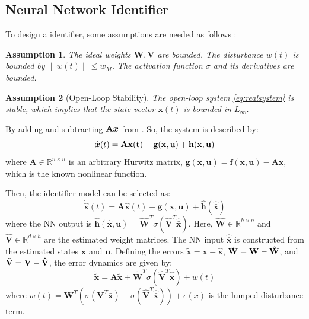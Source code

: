\documentclass[10pt,twocolumn]{ICCAS}
\newcommand{\R}{\mathbb{R}}
\newcommand{\xtilde}{\tilde{\bm{x}}}
\newcommand{\xhat}{\hat{\bm{x}}}
\newcommand{\xbar}{\bar{\bm{x}}}
\newcommand{\xhatbar}{\hat{\bar{\bm{x}}}}
\newcommand{\Wtilde}{\tilde{\mathbf{W}}}
\newcommand{\What}{\hat{\mathbf{W}}}
\newcommand{\Vtilde}{\tilde{\mathbf{V}}}
\newcommand{\Vhat}{\hat{\mathbf{V}}}
\newtheorem{assumption}{Assumption}
\begin{document}
\subsection{Neural Network Identifier}
To design a identifier, some assumptions are needed as follows : 
\begin{assumption}
The ideal weights $\mathbf{W}, \mathbf{V}$ are bounded. The disturbance $w(t)$ is bounded by $\|w(t)\| \le w_M$. The activation function $\sigma$ and its derivatives are bounded.\\
\end{assumption}

\begin{assumption}[Open-Loop Stability]
The open-loop system \eqref{eq:realsystem} is stable, which implies that the state vector $\bm{x}(t)$ is bounded in $L_\infty$.\\ 
\end{assumption}
By adding and subtracting ${\bf{A}}\bm{x}$ from . So, the system is described by:
\begin{equation}
    \dot{\bm{x}}(t) = \bf{A}\bm{x}(t) + \bm{g}(\bm{x}, \bm{u}) + \bm{h}(\bm{x}, \bm{u})
    \label{eq:system}
\end{equation}
where $\mathbf{A} \in \R^{n \times n}$ is an arbitrary Hurwitz matrix, $\bm{g}(\bm{x},\bm{u}) = \bm{f}(\bm{x}, \bm{u}) - {\mathbf{A}} \bm{x} $, which is the known nonlinear function.

Then, the identifier model can be selected as:
\begin{equation}
    \dot{\xhat}(t) = {\mathbf{A}}\bm{\xhat}(t) + \bm{g}(\bm{x}, \bm{u}) + \bm{\hat{h}}(\xhatbar)
    \label{eq:identifier}
\end{equation}
where the NN output is $\bm{\hat{h}}(\bm{\hat{x}},\bm{u}) = \What^T \sigma(\Vhat^T \xhatbar)$. Here, $\What \in \R^{h \times n}$ and $\Vhat \in \R^{d \times h}$ are the estimated weight matrices. The NN input $\xhatbar$ is constructed from the estimated states $\xhat$ and $\bm{u}$.
Defining the errors $\xtilde = \bm{x} - \xhat$, $\Wtilde = \bf{W} - \What$, and $\Vtilde = \bf{V} - \Vhat$, the error dynamics are given by:
\begin{equation}
    \dot{\xtilde} = {\mathbf{A}}\bm{\xtilde} + {\Wtilde}^{T} \sigma(\Vhat^T \bm{\xhatbar}) + w(t)
    \label{eq:error_dyn_final}
\end{equation}
where $w(t) = {\mathbf{W}}^T\left(\sigma({\mathbf{V}}^T\bm{\xbar}) - \sigma(\Vhat^T\xhatbar)\right) + \epsilon(x)$ is the lumped disturbance term.
\end{document}
